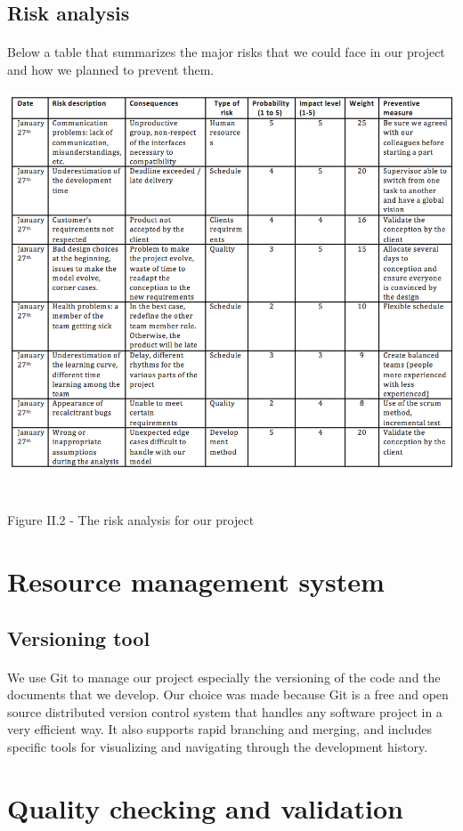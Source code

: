 \documentclass{report}
\begin{document}
\subsection{Risk analysis}


\paragraph{}
\hspace{4mm}\textnormal{Below a table that summarizes the major risks that we could face in our project and how we planned to prevent them.}

\begin{center}
\includegraphics[scale=1.0]{data/RiskManagement.png}
~\\~\\Figure II.2 - The risk analysis for our project
\end{center}

\section{Resource management system}

\subsection{Versioning tool}

\paragraph{}
\hspace{4mm}\textnormal{We use Git to manage our project especially the versioning of the code
and the documents that we develop. Our choice was made 
because Git is a free and open source
 distributed version control system that handles any software 
project in a very efficient way. It also supports rapid branching and merging, 
and includes specific tools for visualizing and 
navigating through the development history.
}

\subsection{}

\section{Quality checking and validation}
\end{document}

